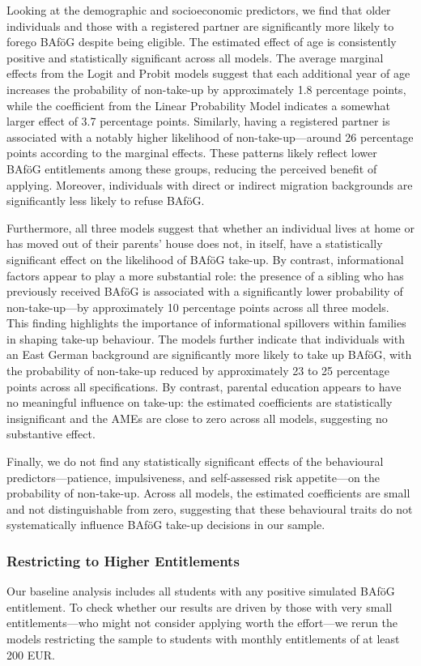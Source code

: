 Looking at the demographic and socioeconomic predictors, we find that older individuals and those with a registered partner are significantly more likely to forego BAföG despite being eligible. 
The estimated effect of age is consistently positive and statistically significant across all models. 
The average marginal effects from the Logit and Probit models suggest that each additional year of age increases the probability of non-take-up by approximately 1.8 percentage points, while the coefficient from the Linear Probability Model indicates a somewhat larger effect of 3.7 percentage points. 
Similarly, having a registered partner is associated with a notably higher likelihood of non-take-up—around 26 percentage points according to the marginal effects. 
These patterns likely reflect lower BAföG entitlements among these groups, reducing the perceived benefit of applying. Moreover, individuals with direct or indirect migration backgrounds are significantly less likely to refuse BAföG.

Furthermore, all three models suggest that whether an individual lives at home or has moved out of their parents' house does not, in itself, have a statistically significant effect on the likelihood of BAföG take-up. 
By contrast, informational factors appear to play a more substantial role: the presence of a sibling who has previously received BAföG is associated with a significantly lower probability of non-take-up—by approximately 10 percentage points across all three models. 
This finding highlights the importance of informational spillovers within families in shaping take-up behaviour. 
The models further indicate that individuals with an East German background are significantly more likely to take up BAföG, with the probability of non-take-up reduced by approximately 23 to 25 percentage points across all specifications. 
By contrast, parental education appears to have no meaningful influence on take-up: the estimated coefficients are statistically insignificant and the AMEs are close to zero across all models, suggesting no substantive effect.

Finally, we do not find any statistically significant effects of the behavioural predictors—patience, impulsiveness, and self-assessed risk appetite—on the probability of non-take-up. 
Across all models, the estimated coefficients are small and not distinguishable from zero, suggesting that these behavioural traits do not systematically influence BAföG take-up decisions in our sample.


\subsubsection{Restricting to Higher Entitlements}
Our baseline analysis includes all students with any positive simulated BAföG entitlement. 
To check whether our results are driven by those with very small entitlements---who might not consider applying worth the effort---we rerun the models restricting the sample to students with monthly entitlements of at least 200 EUR.

